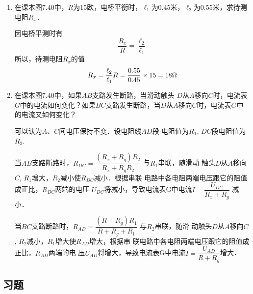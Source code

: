 \begin{enumerate}
\begin{solution}
    \end{solution}
    
    \item 在课本图7.40中，$R$为15欧，电桥平衡时，$\ell_1$为0.45米，$\ell_2$为0.55米，求待测电阻$R_x$．

    \begin{solution}
        因电桥平测时有
\[\frac{R_x}{R}=\frac{\ell_2}{\ell_1}\]
        所以，待测电阻$R_x$的值
\[R_x=\frac{\ell_2}{\ell_1}R=\frac{0.55}{0.45}\times 15=18\Omega\]
    \end{solution}
    
    \item 在课本图7.40中，如果$AB$支路发生断路，当滑动触头
    $D$从$A$移向$C$时，电流表$G$中的电流如何变化？如果$BC$支路发生断路，当$D$从$A$移向$C$时，电流表$G$中的电流又如何变化？

    \begin{solution}
        可以认为$A$、$C$间电压保持不变．设电阻线$AD$段
        电阻值为$R_1$, $DC$段电阻值为$R_2$.

        当$AB$支路断路时，$R_{DC}=\dfrac{(R_x+R_g)R_2}{R_x+R_gR_2}$
        与$R_1$串联，随滑动
        触头$D$从$A$移向$C$, $R_1$增大，$R_2$减小使$R_{DC}$减小．根据串联
        电路中各电阻两端电压跟它的阻值成正比，$R_{DC}$两端的电压
$U_{DC}$将减小，导致电流表G中电流$I=\dfrac{U_{DC}}{R_x+R_g}$
减小．

当$BC$支路断路时，$R_{AD}=\dfrac{(R+R_g)R_1}{R+R_g+R_1}$
与$R_2$串联，随滑
动触头$D$从$A$移向$C$, $R_2$减小，$R_1$增大使$R_{AD}$增大，根据串
联电路中各电阻两端电压跟它的阻值成正比，$R_{AD}$两端的电
压$U_{AD}$将增大，导致电流表G中电流$I=\dfrac{U_{AD}}{R+R_g}$增大．
    \end{solution}
    
\end{enumerate}






\subsection{习题}

